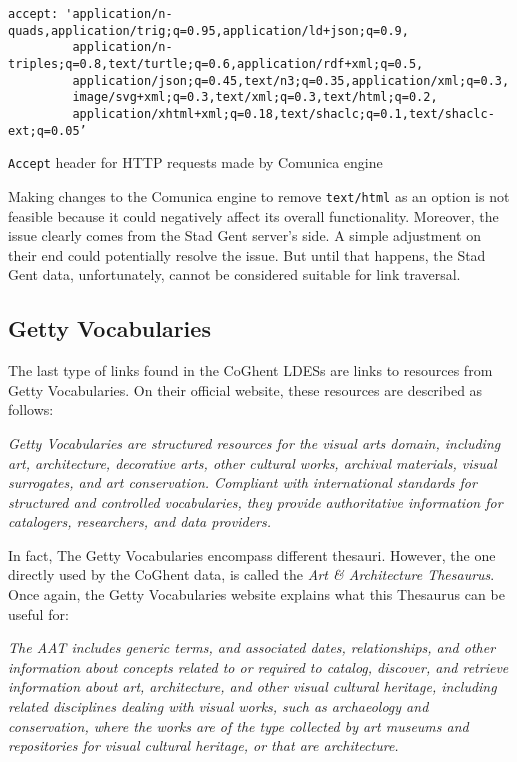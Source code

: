\begin{listing}[htbp]
    \begin{verbatim}
accept: 'application/n-quads,application/trig;q=0.95,application/ld+json;q=0.9,
         application/n-triples;q=0.8,text/turtle;q=0.6,application/rdf+xml;q=0.5,
         application/json;q=0.45,text/n3;q=0.35,application/xml;q=0.3,
         image/svg+xml;q=0.3,text/xml;q=0.3,text/html;q=0.2,
         application/xhtml+xml;q=0.18,text/shaclc;q=0.1,text/shaclc-ext;q=0.05’
    \end{verbatim}
    \caption{\texttt{Accept} header for HTTP requests made by Comunica engine}
    \label{lst:accept_header_comunica}
\end{listing}

Making changes to the Comunica engine to remove \texttt{text/html} as an option is not feasible because it could negatively affect its overall functionality. Moreover, the issue clearly comes from the Stad Gent server's side. A simple adjustment on their end could potentially resolve the issue. But until that happens, the Stad Gent data, unfortunately, cannot be considered suitable for link traversal.

\subsection{Getty Vocabularies}

The last type of links found in the CoGhent LDESs are links to resources from Getty Vocabularies. On their official website, these resources are described as follows:
\begin{flushright}
    \textit{Getty Vocabularies are structured resources for the visual arts domain, including art, architecture, decorative arts, other cultural works, archival materials, visual surrogates, and art conservation. Compliant with international standards for structured and controlled vocabularies, they provide authoritative information for catalogers, researchers, and data providers.}
    \linebreak\citep{gettyvocabularies}
\end{flushright}

In fact, The Getty Vocabularies encompass different thesauri. However, the one directly used by the CoGhent data, is called the \textit{Art \& Architecture Thesaurus}. Once again, the Getty Vocabularies website explains what this Thesaurus can be useful for:
\begin{flushright}
    \textit{The AAT includes generic terms, and associated dates, relationships, and other information about concepts related to or required to catalog, discover, and retrieve information about art, architecture, and other visual cultural heritage, including related disciplines dealing with visual works, such as archaeology and conservation, where the works are of the type collected by art museums and repositories for visual cultural heritage, or that are architecture.}
    \linebreak\citep{getty2023aat}
\end{flushright}

